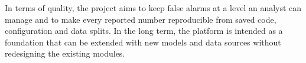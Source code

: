 In terms of quality, the project aims to keep false alarms at a level an analyst can manage and to make every reported number reproducible from saved code, configuration and data splits. In the long term, the platform is intended as a foundation that can be extended with new models and data sources without redesigning the existing modules.
